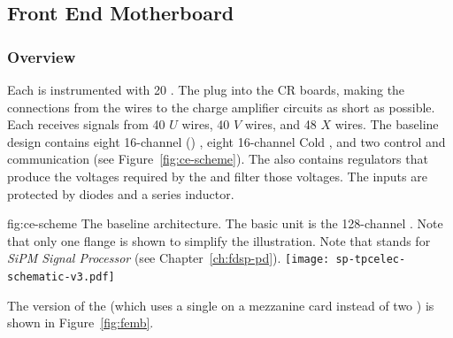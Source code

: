 
\subsection{Front End Motherboard}
\label{sec:fdsp-tpcelec-design-femb}


\subsubsection{Overview}
\label{sec:fdsp-tpcelec-design-femb-overview}

Each  is instrumented with \num{20} .
The  plug into the  CR boards, making the connections from the wires to the charge amplifier circuits as short as possible.
Each  receives signals from \num{40} $U$ wires, \num{40} $V$ wires, and \num{48} $X$ wires.
The baseline  design contains eight \num{16}-channel  () , eight \num{16}-channel Cold  , and two  control and communication  (see Figure~\ref{fig:ce-scheme}).
The  also contains regulators that produce the voltages required by the  and 
filter those voltages.
The  inputs are protected by diodes and a series inductor.

\begin{dunefigure}
{fig:ce-scheme}
{The baseline  architecture. The basic unit is the \num{128}-channel . Note that only one  flange is shown to simplify the illustration. Note that  stands for \textit{SiPM Signal Processor} (see Chapter~\ref{ch:fdsp-pd}).}
\texttt{[image: sp-tpcelec-schematic-v3.pdf]}
\end{dunefigure}

The  version of the  (which uses a single  on a mezzanine card instead of two  ) is shown in Figure~\ref{fig:femb}.

